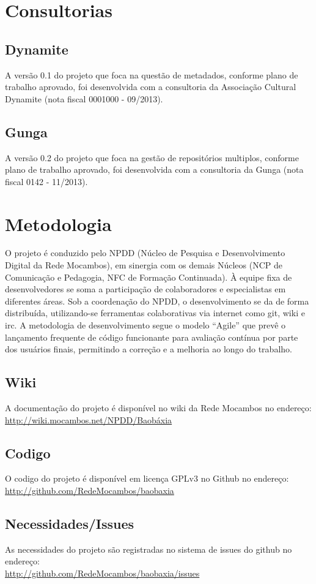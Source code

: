 \section{Consultorias}
\subsection{Dynamite}
A versão 0.1 do projeto que foca na questão de metadados, conforme
plano de trabalho aprovado, foi desenvolvida com a consultoria da
Associação Cultural Dynamite (nota fiscal 0001000 - 09/2013).

\subsection{Gunga}
A versão 0.2 do projeto que foca na gestão de repositórios multiplos,
conforme plano de trabalho aprovado, foi desenvolvida com a
consultoria da Gunga (nota fiscal 0142 - 11/2013).


\section{Metodologia}
O projeto é conduzido pelo NPDD (Núcleo de Pesquisa e Desenvolvimento
Digital da Rede Mocambos), em sinergia com os demais Núcleos (NCP de
Comunicação e Pedagogia, NFC de Formação Continuada). À equipe fixa de
desenvolvedores se soma a participação de colaboradores e
especialistas em diferentes áreas. Sob a coordenação do NPDD, o
desenvolvimento se da de forma distribuída, utilizando-se ferramentas
colaborativas via internet como git, wiki e irc. A metodologia de
desenvolvimento segue o modelo ``Agile'' que prevê o lançamento
frequente de código funcionante para avaliação contínua por parte dos
usuários finais, permitindo a correção e a melhoria ao longo do
trabalho.

\subsection{Wiki}
A documentação do projeto é disponível no wiki da Rede Mocambos no
endereço: \\ \url{http://wiki.mocambos.net/NPDD/Baobáxia}

\subsection{Codigo}
O codigo do projeto é disponível em licença GPLv3 no Github no
endereço: \\ \url{http://github.com/RedeMocambos/baobaxia}

\subsection{Necessidades/Issues}
As necessidades do projeto são registradas no sistema de issues do
github no endereço:
\\ \url{http://github.com/RedeMocambos/baobaxia/issues}

